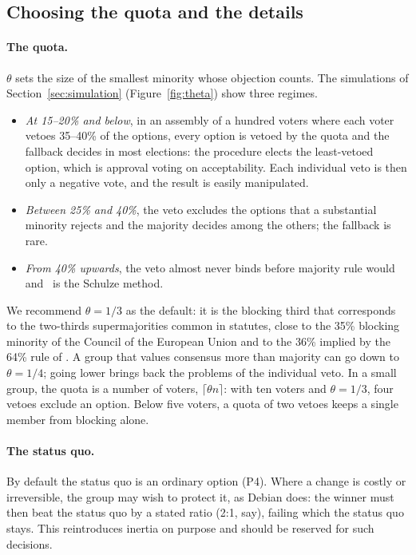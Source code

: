 \subsection{Choosing the quota and the details}\label{sec:theta}

\paragraph{The quota.} $\theta$ sets the size of the smallest minority whose objection counts. The
simulations of Section~\ref{sec:simulation} (Figure~\ref{fig:theta}) show three regimes.
\begin{itemize}
  \item \emph{At 15--20\% and below}, in an assembly of a hundred voters where each voter vetoes 35--40\% of
  the options, every option is vetoed by the quota and the fallback decides in most elections: the
  procedure elects the least-vetoed option, which is approval voting on acceptability. Each individual
  veto is then only a negative vote, and the result is easily manipulated.
  \item \emph{Between 25\% and 40\%}, the veto excludes the options that a substantial minority rejects
  and the majority decides among the others; the fallback is rare.
  \item \emph{From 40\% upwards}, the veto almost never binds before majority rule would and \QVC\ is the
  Schulze method.
\end{itemize}
We recommend $\theta = 1/3$ as the default: it is the blocking third that corresponds to the two-thirds
supermajorities common in statutes, close to the 35\% blocking minority of the Council of the European
Union and to the 36\% implied by the 64\% rule of \citet{CaplinNalebuff1988}. A group that values
consensus more than majority can go down to $\theta = 1/4$; going lower brings back the problems of the
individual veto. In a small group, the quota is a number of voters, $\lceil \theta n \rceil$: with ten
voters and $\theta = 1/3$, four vetoes exclude an option. Below five voters, a quota of two vetoes keeps a
single member from blocking alone.

\paragraph{The status quo.} By default the status quo is an ordinary option (P4). Where a change is
costly or irreversible, the group may wish to protect it, as Debian does: the winner must then beat the
status quo by a stated ratio (2:1, say), failing which the status quo stays. This reintroduces inertia
on purpose and should be reserved for such decisions.

